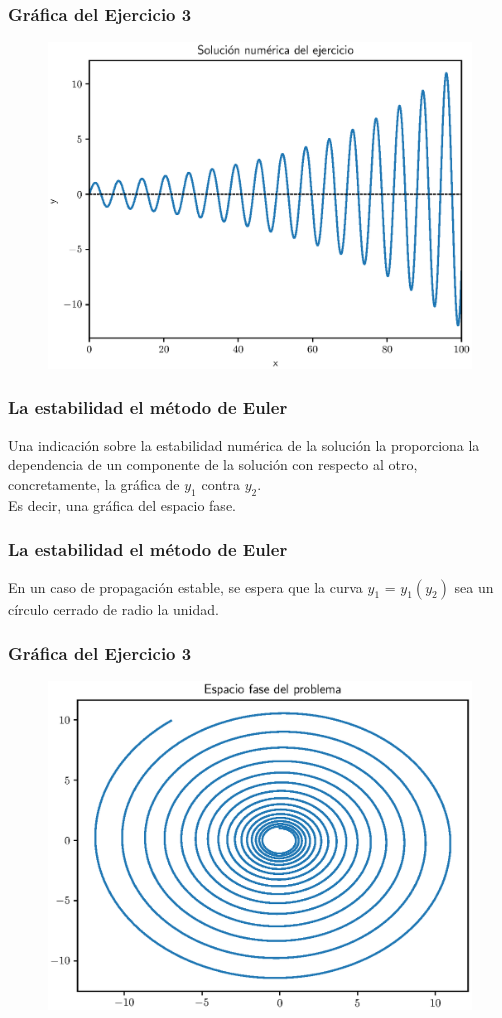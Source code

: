 \documentclass[12pt]{beamer}
\begin{document}
\begin{frame}
\frametitle{Gráfica del Ejercicio 3}
\begin{figure}
	\centering
	\includegraphics[scale=0.55]{Imagenes/plot_euler_ejercicio_04.eps}
\end{figure}
\end{frame}
\begin{frame}
\frametitle{La estabilidad el método de Euler}
Una indicación sobre la estabilidad numérica de la solución la proporciona la dependencia de un componente de la solución con respecto al otro, \pause concretamente, la gráfica de $y_{1}$ contra $y_{2}$. 
\\
\bigskip
\pause
Es decir, una gráfica del espacio fase.
\end{frame}
\begin{frame}
\frametitle{La estabilidad el método de Euler}
En un caso de propagación estable, se espera que la curva $y_{1}$ = $y_{1} (y_{2})$ sea un círculo cerrado de radio la unidad.
\end{frame}
\begin{frame}
\frametitle{Gráfica del Ejercicio 3}
\begin{figure}
	\centering
	\includegraphics[scale=0.55]{Imagenes/plot_euler_ejercicio_05.eps}
\end{figure}
\end{frame}
\end{document}
